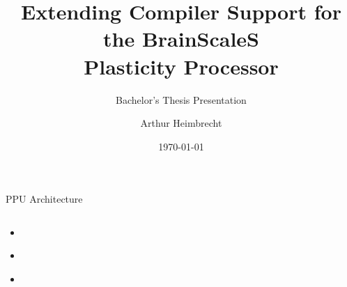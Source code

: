 \documentclass[10pt,aspectratio=169]{beamer}
\title{Extending Compiler Support for the BrainScaleS \\ Plasticity Processor}
\subtitle{Bachelor's Thesis Presentation}
\author{Arthur Heimbrecht}
\institute{}
\date{\today}
\begin{document}
\begin{frame}[plain]
\maketitle
\end{frame}

\begin{frame}{PPU Architecture}
    \begin{columns}[c]
    \begin{column}{0.5\textwidth}
        \begin{itemize}
            \item \begin{center}\end{center}
            \item \begin{center}\end{center}
            \item \begin{center}\end{center}
        \end{itemize}
    \end{column}

    \begin{column}{0.5\textwidth}
        \centering
        \vspace*{3em}
        \begin{figure}
                \begin{adjustbox}{center, max width={.7\columnwidth}}
                    
                \end{adjustbox}
        \end{figure}
    \end{column}
    \end{columns}

\end{frame}
\end{document}
